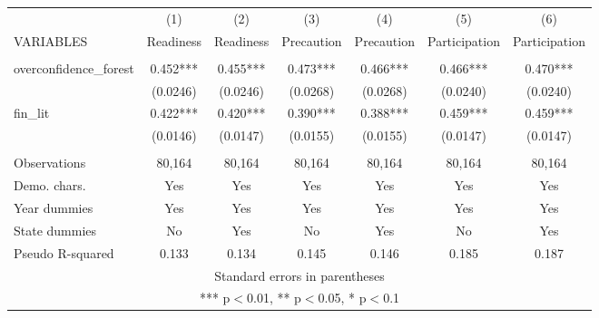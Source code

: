 \documentclass[]{article}
\begin{document}
\begin{tabular}{lcccccc} \hline
 & (1) & (2) & (3) & (4) & (5) & (6) \\
VARIABLES & Readiness & Readiness & Precaution & Precaution & Participation & Participation \\ \hline
 &  &  &  &  &  &  \\
overconfidence\_forest & 0.452*** & 0.455*** & 0.473*** & 0.466*** & 0.466*** & 0.470*** \\
 & (0.0246) & (0.0246) & (0.0268) & (0.0268) & (0.0240) & (0.0240) \\
fin\_lit & 0.422*** & 0.420*** & 0.390*** & 0.388*** & 0.459*** & 0.459*** \\
 & (0.0146) & (0.0147) & (0.0155) & (0.0155) & (0.0147) & (0.0147) \\
 &  &  &  &  &  &  \\
Observations & 80,164 & 80,164 & 80,164 & 80,164 & 80,164 & 80,164 \\
Demo. chars. & Yes & Yes & Yes & Yes & Yes & Yes \\
Year dummies & Yes & Yes & Yes & Yes & Yes & Yes \\
State dummies & No & Yes & No & Yes & No & Yes \\
 Pseudo R-squared & 0.133 & 0.134 & 0.145 & 0.146 & 0.185 & 0.187 \\ \hline
\multicolumn{7}{c}{ Standard errors in parentheses} \\
\multicolumn{7}{c}{ *** p$<$0.01, ** p$<$0.05, * p$<$0.1} \\
\end{tabular}
\end{document}
